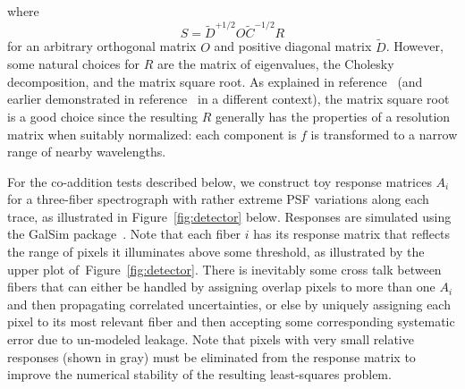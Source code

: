 \documentclass[12pt]{article}
\providecommand{\fig}[1]{Figure~\ref{fig:#1}}
\begin{document}
where
\begin{equation}
S = \tilde{D}^{+1/2} O \tilde{C}^{-1/2} R
\end{equation}
for an arbitrary orthogonal matrix $O$ and positive diagonal matrix $\tilde{D}$. However, some natural choices for $R$ are the matrix of eigenvalues, the Cholesky decomposition, and the matrix square root. As explained in reference~\cite{2010PASP..122..248B} (and earlier demonstrated in reference~\cite{2000MNRAS.312..285H} in a different context), the matrix square root is a good choice since the resulting $R$ generally has the properties of a resolution matrix when suitably normalized: each component is $f$ is transformed to a narrow range of nearby wavelengths.

For the co-addition tests described below, we construct toy response matrices $A_i$ for a three-fiber spectrograph with rather extreme PSF variations along each trace, as illustrated in \fig{detector} below. Responses are simulated using the GalSim package~\cite{2014arXiv1407.7676R}. Note that each fiber $i$ has its response matrix that reflects the range of pixels it illuminates above some threshold, as illustrated by the upper plot of~\fig{detector}.  There is inevitably some cross talk between fibers that can either be handled by assigning overlap pixels to more than one $A_i$ and then propagating correlated uncertainties, or else by uniquely assigning each pixel to its most relevant fiber and then accepting some corresponding systematic error due to un-modeled leakage. Note that pixels with very small relative responses (shown in gray) must be eliminated from the response matrix to improve the numerical stability of the resulting least-squares problem.
\end{document}
